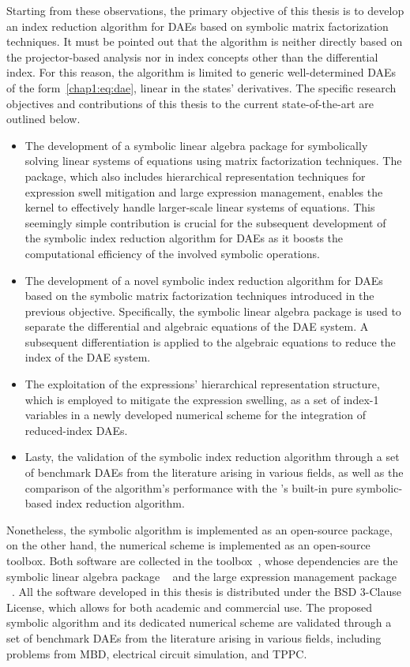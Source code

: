 Starting from these observations, the primary objective of this thesis is to develop an index reduction algorithm for \acp{DAE} based on symbolic matrix factorization techniques. It must be pointed out that the algorithm is neither directly based on the projector-based analysis nor in index concepts other than the differential index. For this reason, the algorithm is limited to generic well-determined \acp{DAE} of the form~\eqref{chap1:eq:dae}, linear in the states' derivatives. The specific research objectives and contributions of this thesis to the current state-of-the-art are outlined below.
%
\begin{itemize}
  \item The development of a symbolic linear algebra package for symbolically solving linear systems of equations using matrix factorization techniques. The package, which also includes hierarchical representation techniques for expression swell mitigation and large expression management, enables the \Maple{} kernel to effectively handle larger-scale linear systems of equations. This seemingly simple contribution is crucial for the subsequent development of the symbolic index reduction algorithm for \acp{DAE} as it boosts the computational efficiency of the involved symbolic operations.
  \item The development of a novel symbolic index reduction algorithm for \acp{DAE} based on the symbolic matrix factorization techniques introduced in the previous objective. Specifically, the symbolic linear algebra package is used to separate the differential and algebraic equations of the \ac{DAE} system. A subsequent differentiation is applied to the algebraic equations to reduce the index of the \ac{DAE} system.
  \item The exploitation of the expressions' hierarchical representation structure, which is employed to mitigate the expression swelling, as a set of index-1 variables in a newly developed numerical scheme for the integration of reduced-index \acp{DAE}.
  \item Lasty, the validation of the symbolic index reduction algorithm through a set of benchmark \acp{DAE} from the literature arising in various fields, as well as the comparison of the algorithm's performance with the \Maple{}'s built-in pure symbolic-based index reduction algorithm.
\end{itemize}
%
Nonetheless, the symbolic algorithm is implemented as an open-source \Maple{} package, on the other hand, the numerical scheme is implemented as an open-source \Matlab{} toolbox. Both software are collected in the \Indigo{} toolbox~\cite{indigo}, whose dependencies are the symbolic linear algebra package \LAST{}~\cite{last} and the large expression management package \LEM{}~\cite{lem}. All the software developed in this thesis is distributed under the \ac{BSD} 3-Clause License, which allows for both academic and commercial use. The proposed symbolic algorithm and its dedicated numerical scheme are validated through a set of benchmark \acp{DAE} from the literature arising in various fields, including problems from \ac{MBD}, electrical circuit simulation, and \ac{TPPC}.


